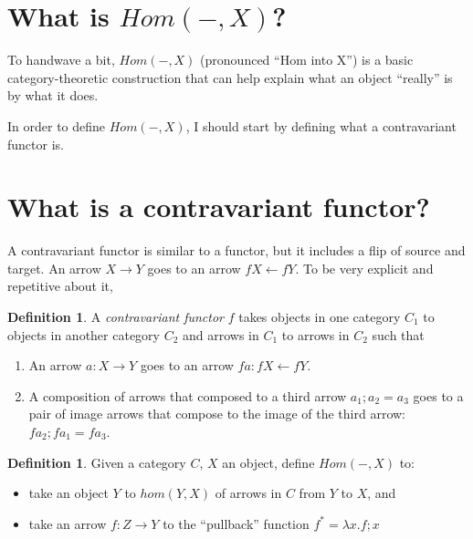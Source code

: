 \documentclass{proc-l}
\theoremstyle{definition}
\newtheorem{definition}[theorem]{Definition}
\theoremstyle{remark}
\numberwithin{equation}{section}
\begin{document}
\section{What is $Hom(-, X)$?}

To handwave a bit, $Hom(-, X)$ (pronounced ``Hom into X'') is a basic category-theoretic construction that can help explain what an object ``really'' is by what it does. 

In order to define $Hom(-, X)$, I should start by defining what a contravariant functor is.

\section{What is a contravariant functor?}

A contravariant functor is similar to a functor, but it includes a flip of source and target. An arrow $X \rightarrow Y$ goes to an arrow $f X \leftarrow f Y$. To be very explicit and repetitive about it,

\begin{definition}
\label{contravariantfunctordefn}
A \emph{contravariant functor} $f$ takes objects in one category $C_1$ to objects in another category $C_2$ and arrows in $C_1$ to arrows in $C_2$ such that
\begin{enumerate}

\item An arrow $a : X \rightarrow Y$ goes to an arrow $f a : f X \leftarrow f Y$.

\item A composition of arrows that composed to a third arrow $a_1 ; a_2 = a_3$ goes to a pair of image arrows that compose to the image of the third arrow: $f a_2 ; f a_1 = f a_3$.




\end{enumerate}
\end{definition}

\begin{definition}
\label{homIntoXDef}
Given a category $C$, $X$ an object, define $Hom(-, X)$ to:
\begin{itemize}
  \item take an object $Y$ to $hom(Y, X)$ of arrows in $C$ from $Y$ to $X$, and
  \item take an arrow $f: Z \rightarrow Y$ to the ``pullback'' function $f^* = \lambda x . f ; x$
\end{itemize}
\end{definition}
\end{document}
